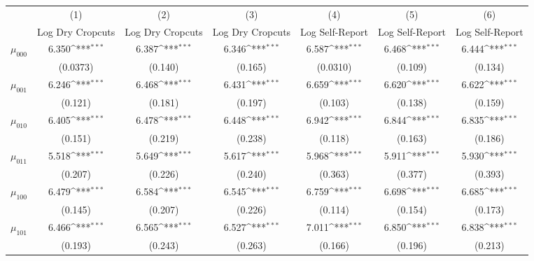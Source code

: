 {
\def\sym#1{\ifmmode^{#1}\else\(^{#1}\)\fi}
\begin{tabular}{l*{6}{c}}
\hline\hline
          &\multicolumn{1}{c}{(1)}&\multicolumn{1}{c}{(2)}&\multicolumn{1}{c}{(3)}&\multicolumn{1}{c}{(4)}&\multicolumn{1}{c}{(5)}&\multicolumn{1}{c}{(6)}\\
          &\multicolumn{1}{c}{Log Dry Cropcuts}&\multicolumn{1}{c}{Log Dry Cropcuts}&\multicolumn{1}{c}{Log Dry Cropcuts}&\multicolumn{1}{c}{Log Self-Report}&\multicolumn{1}{c}{Log Self-Report}&\multicolumn{1}{c}{Log Self-Report}\\
\hline
$\mu_{000}$&    6.350\sym{***}&    6.387\sym{***}&    6.346\sym{***}&    6.587\sym{***}&    6.468\sym{***}&    6.444\sym{***}\\
          & (0.0373)         &  (0.140)         &  (0.165)         & (0.0310)         &  (0.109)         &  (0.134)         \\
$\mu_{001}$&    6.246\sym{***}&    6.468\sym{***}&    6.431\sym{***}&    6.659\sym{***}&    6.620\sym{***}&    6.622\sym{***}\\
          &  (0.121)         &  (0.181)         &  (0.197)         &  (0.103)         &  (0.138)         &  (0.159)         \\
$\mu_{010}$&    6.405\sym{***}&    6.478\sym{***}&    6.448\sym{***}&    6.942\sym{***}&    6.844\sym{***}&    6.835\sym{***}\\
          &  (0.151)         &  (0.219)         &  (0.238)         &  (0.118)         &  (0.163)         &  (0.186)         \\
$\mu_{011}$&    5.518\sym{***}&    5.649\sym{***}&    5.617\sym{***}&    5.968\sym{***}&    5.911\sym{***}&    5.930\sym{***}\\
          &  (0.207)         &  (0.226)         &  (0.240)         &  (0.363)         &  (0.377)         &  (0.393)         \\
$\mu_{100}$&    6.479\sym{***}&    6.584\sym{***}&    6.545\sym{***}&    6.759\sym{***}&    6.698\sym{***}&    6.685\sym{***}\\
          &  (0.145)         &  (0.207)         &  (0.226)         &  (0.114)         &  (0.154)         &  (0.173)         \\
$\mu_{101}$&    6.466\sym{***}&    6.565\sym{***}&    6.527\sym{***}&    7.011\sym{***}&    6.850\sym{***}&    6.838\sym{***}\\
          &  (0.193)         &  (0.243)         &  (0.263)         &  (0.166)         &  (0.196)         &  (0.213)         \\

\end{tabular}}
